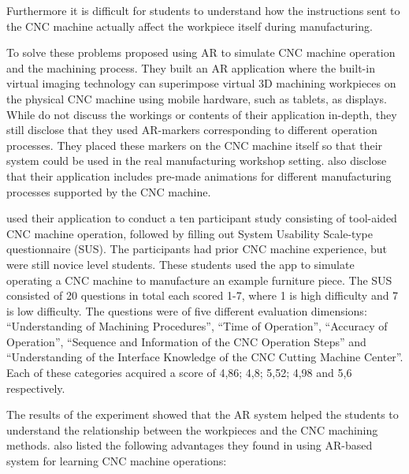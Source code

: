 Furthermore it is difficult for students to understand how the instructions 
sent to the CNC machine actually affect the workpiece itself during 
manufacturing.\cite{LinAndLee2020}\par
	To solve these problems \textcite{LinAndLee2020} proposed using AR to 
simulate CNC machine operation and the machining process.\cite{LinAndLee2020} 
They built an AR application where the built-in virtual imaging technology 
can superimpose virtual 3D machining workpieces on the physical CNC machine 
using mobile hardware, such as tablets, as displays.\cite{LinAndLee2020} 
While \textcite{LinAndLee2020} do not discuss the workings or contents of 
their application in-depth, they still disclose that they used AR-markers 
corresponding to different operation processes. They placed these markers on 
the CNC machine itself so that their system could be used in the real 
manufacturing workshop setting.\cite{LinAndLee2020} \textcite{LinAndLee2020} 
also disclose that their application includes pre-made animations for 
different manufacturing processes supported by the CNC machine.\par
	\textcite{LinAndLee2020} used their application to conduct a ten 
participant study consisting of tool-aided CNC machine operation, followed by 
filling out System Usability Scale-type questionnaire (SUS). The participants 
had prior CNC machine experience, but were still novice level 
students.\cite{LinAndLee2020} These students used the app to simulate 
operating a CNC machine to manufacture an example furniture piece. The SUS 
consisted of 20 questions in total each scored 1-7, where 1 is high 
difficulty and 7 is low difficulty. The questions were of five different 
evaluation dimensions: “Understanding of Machining Procedures”, “Time of 
Operation”, “Accuracy of Operation”, “Sequence and Information of the CNC 
Operation Steps” and “Understanding of the Interface Knowledge of the CNC 
Cutting Machine Center”.\cite{LinAndLee2020} Each of these categories acquired 
a score of 4,86; 4,8; 5,52; 4,98 and 5,6 respectively.\cite{LinAndLee2020}\par
	The results of the experiment showed that the AR system helped the 
students to understand the relationship between the workpieces and the CNC 
machining methods.\cite{LinAndLee2020} \textcite{LinAndLee2020} also listed 
the following advantages they found in using AR-based system for learning CNC 
machine operations:
